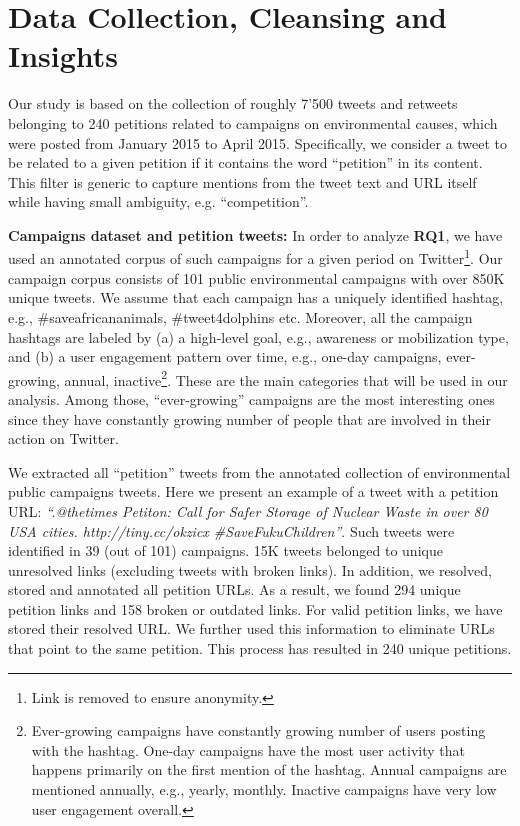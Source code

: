 \section{Data Collection, Cleansing and Insights}
\label{sec:dataset}

Our study is based on the collection of roughly 7'500 tweets and retweets belonging to 240 petitions related to campaigns on environmental causes, which were posted from January 2015 to April 2015. Specifically, we consider a tweet to be related to a given petition if it contains the word ``petition'' in its content. This filter is generic to capture mentions from the tweet text and URL itself while having small ambiguity, e.g. ``competition''.

\textbf{Campaigns dataset and petition tweets:}
In order to analyze \textbf{RQ1},
we have used an annotated corpus of such campaigns for a given period on Twitter\footnote{Link is removed to ensure anonymity.}.
Our campaign corpus consists of 101 public environmental campaigns with over 850K unique tweets. 
We assume that each campaign has a uniquely identified hashtag, e.g., \#saveafricananimals, \#tweet4dolphins etc.
Moreover, all the campaign hashtags are labeled by (a) a high-level goal, e.g., awareness or mobilization type, and (b) a user engagement pattern over time, e.g., one-day campaigns, ever-growing, annual, inactive\footnote{
Ever-growing campaigns have constantly growing number of users posting with the hashtag.
One-day campaigns have the most user activity that happens primarily on the first mention of the hashtag.
Annual campaigns are mentioned annually, e.g., yearly, monthly. Inactive campaigns have very low user engagement overall.}.
These are the main categories that will be used in our analysis.
Among those, ``ever-growing'' campaigns are the most interesting ones since they have constantly growing number of people that are involved in their action on Twitter.

We extracted all ``petition'' tweets from the annotated collection of environmental public campaigns tweets.
Here we present an example of a tweet with a petition URL: \textit{``.@thetimes Petiton: Call for Safer Storage of Nuclear Waste in over 80 USA cities. http://tiny.cc/okzicx  \#SaveFukuChildren''}.
Such tweets were identified in 39 (out of 101) campaigns. 15K tweets belonged to unique unresolved links (excluding tweets with broken links).
In addition, we resolved, stored and annotated all petition URLs. As a result, we found 294 unique petition links and 158 broken or outdated links.
For valid petition links, we have stored their resolved URL. We further used this information to eliminate URLs that point to the same petition.
This process has resulted in 240 unique petitions.

